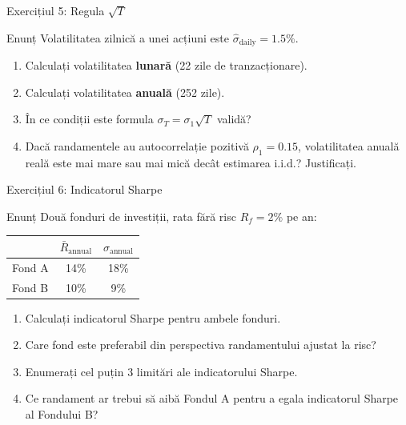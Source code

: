 \documentclass[9pt, aspectratio=169, t]{beamer}
\theoremstyle{definition}
\begin{document}
\begin{frame}{Exercițiul 5: Regula $\sqrt{T}$}
\begin{block}{Enunț}
Volatilitatea zilnică a unei acțiuni este $\hat{\sigma}_{\text{daily}} = 1.5\%$.
\end{block}
\begin{enumerate}
    \item Calculați volatilitatea \textbf{lunară} (22 zile de tranzacționare).
    \item Calculați volatilitatea \textbf{anuală} (252 zile).
    \item În ce condiții este formula $\sigma_T = \sigma_1\sqrt{T}$ validă?
    \item Dacă randamentele au autocorrelație pozitivă $\rho_1 = 0.15$, volatilitatea anuală reală este mai mare sau mai mică decât estimarea i.i.d.? Justificați.
\end{enumerate}
\end{frame}

\begin{frame}{Exercițiul 6: Indicatorul Sharpe}
\begin{block}{Enunț}
Două fonduri de investiții, rata fără risc $R_f = 2\%$ pe an:
\begin{center}
{\small
\renewcommand{\arraystretch}{1.2}
\begin{tabular}{lcc}
\toprule
& $\bar{R}_{\text{annual}}$ & $\sigma_{\text{annual}}$ \\
\midrule
Fond A & 14\% & 18\% \\
Fond B & 10\% & 9\% \\
\bottomrule
\end{tabular}
}
\end{center}
\end{block}
\begin{enumerate}
    \item Calculați indicatorul Sharpe pentru ambele fonduri.
    \item Care fond este preferabil din perspectiva randamentului ajustat la risc?
    \item Enumerați cel puțin 3 limitări ale indicatorului Sharpe.
    \item Ce randament ar trebui să aibă Fondul A pentru a egala indicatorul Sharpe al Fondului B?
\end{enumerate}
\end{frame}
\end{document}
